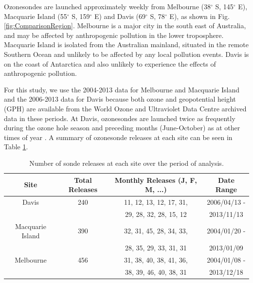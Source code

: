 \documentclass[acp, manuscript]{copernicus} %
\begin{document}
    Ozonesondes are launched approximately weekly from Melbourne (38$^{\circ}$ S, 145$^{\circ}$ E), Macquarie Island (55$^{\circ}$ S, 159$^{\circ}$ E) and Davis (69$^{\circ}$ S, 78$^{\circ}$ E), as shown in Fig. \ref{fig:ComparisonRegion}. 
    Melbourne is a major city in the south east of Australia, and may be affected by anthropogenic pollution in the lower troposphere.
    Macquarie Island is isolated from the Australian mainland, situated in the remote Southern Ocean and unlikely to be affected by any local pollution events.
    Davis is on the coast of Antarctica and also unlikely to experience the effects of anthropogenic pollution.
    
    For this study, we use the 2004-2013 data for Melbourne and Macquarie Island and the 2006-2013 data for Davis because both ozone and geopotential height (GPH) are available from the World Ozone and Ultraviolet Data Centre archived data in these periods.
    At Davis, ozonesondes are launched twice as frequently during the ozone hole season and preceding months (June-October) as at other times of year \citep{Alexander2013}.
    A summary of ozonesonde releases at each site can be seen in Table \ref{table:sondesummary}.
    
    \begin{table}[t]
      \caption{Number of sonde releases at each site over the period of analysis.}
      \begin{tabular}{ c   c   c   c  } 
	\hline
	Site 		 & Total Releases & Monthly Releases (J, F, M, ...) & Date Range \\
	\hline
	Davis		 & 240	& 11, 12, 13, 12, 17, 31,	& 2006/04/13 -  \\ 
			 &	& 29, 28, 32, 28, 15, 12 	& 2013/11/13	\\
	Macquarie Island & 390	& 32, 31, 45, 28, 34, 33,	& 2004/01/20 -  \\
			 &	& 28, 35, 29, 33, 31, 31 	& 2013/01/09	\\ 
	Melbourne 	 & 456	& 31, 38, 40, 38, 41, 36,	& 2004/01/08 -  \\
			 &	& 38, 39, 46, 40, 38, 31 	& 2013/12/18	\\
	\hline
      \end{tabular}
      \label{table:sondesummary}
    \end{table}
    
\end{document}
